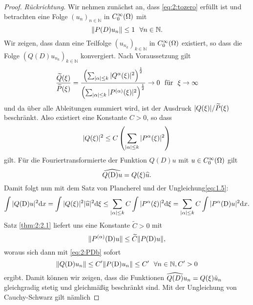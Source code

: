 \begin{proof} {\it Rückrichtung.}
Wir nehmen zunächst an, dass \eqref{eq:2:tozero} erfüllt ist und betrachten eine Folge ${(u_n)}_{n \in \mathbb{N}} $ in $C^\infty_0(\Omega)$ mit
\begin{equation}\label{eq:2:PDb}
\lVert P(D)u_n\rVert\leq1 \ \ \forall n \in \mathbb{N}.
\end{equation}
Wir zeigen, dass dann eine Teilfolge ${(u_{n_k})}_{k \in \mathbb{N}}$ in $C^\infty_0(\Omega)$ existiert,
so dass die Folge $\left(Q(D)u_{n_k}\right)_{k \in \mathbb{N}}$ konvergiert.
Nach Voraussetzung gilt 
\begin{equation}
\frac{\widetilde{Q}(\xi)}{\widetilde{P}(\xi)} = \frac{\left( \sum_{|\alpha| \leq k} | Q^{\alpha} (\xi)|^2 \right)^{\frac{1}{2}} }{ \left(\sum_{|\alpha| \leq k} | P^{(\alpha)} (\xi)|^2\right)^{\frac{1}{2}}} \rightarrow 0\ \ \text{für} \ \ \xi \rightarrow \infty
\end{equation}
und da über alle Ableitungen summiert wird, ist der Ausdruck $|Q(\xi)|/\widetilde{P}(\xi)$ beschränkt. Also existiert eine Konstante $C>0$, so dass
\begin{equation}
|Q(\xi)|^2 \leq C \left(\sum_{|\alpha| \leq k} | P^{\alpha} (\xi)|^2 \right)\label{eq:1.5}
\end{equation}
gilt. Für die Fouriertransformierte der Funktion $Q(D)u$ mit $u \in C^\infty_0(\Omega)$ gilt 
\begin{equation}
\widehat{Q(\mathrm D)u} = Q(\xi) \widehat{u}.
\end{equation}
Damit folgt nun mit dem Satz von Plancherel und der Ungleichung\eqref{eq:1.5}:
\begin{equation}
\int |Q(\mathrm D)u|^2 \mathrm{d}x = \int |Q(\xi)|^2 |\widehat{u}|^2 \mathrm{d}\xi \leq  \sum_{|\alpha| \leq k}C\int | P^{\alpha} (\xi)|^2 \mathrm{d}\xi =\sum_{|\alpha| \leq k} C\int |P^{\alpha}(\mathrm D)u|^2 \mathrm{d}x.
\end{equation}
Satz \ref{thm:2:2.1} liefert uns eine Konstante $\widetilde{C}>0$ mit
\begin{equation}
\Vert P^{(\alpha)}(\mathrm D)u \Vert \leq \widetilde{C} \Vert P(\mathrm D)u \Vert, \label{eq:ableitung leq PD}
\end{equation}
woraus sich dann mit \eqref{eq:2:PDb} sofort
\begin{equation}
\norm{Q(\D)u_n}\leq C' \norm{P(\D)u_n} \leq C' \ \ \forall n \in \mathbb{N}, C' >0
\end{equation}
ergibt. Damit können wir zeigen, dass die Funktionen $\widehat{Q(D)}u_n = Q(\xi) \hat{u}_n$ gleichgradig stetig und gleichmäßig beschränkt sind. Mit der Ungleichung von Cauchy-Schwarz gilt nämlich

\end{proof}

